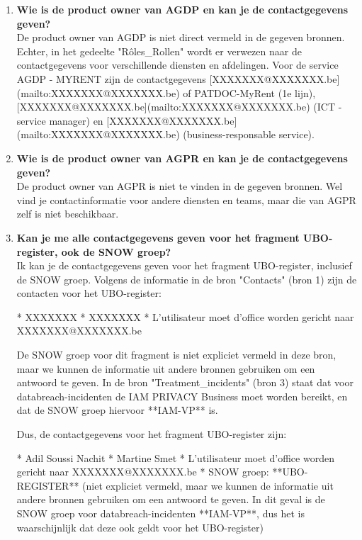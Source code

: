 \begin{enumerate}
    \item \textbf{Wie is de product owner van AGDP en kan je de contactgegevens geven?} \\
    De product owner van AGDP is niet direct vermeld in de gegeven bronnen. Echter, in het gedeelte "Rôles\_Rollen" wordt er verwezen naar de contactgegevens voor verschillende diensten en afdelingen. Voor de service AGDP - MYRENT zijn de contactgegevens [XXXXXXX@XXXXXXX.be](mailto:XXXXXXX@XXXXXXX.be) of PATDOC-MyRent (1e lijn), [XXXXXXX@XXXXXXX.be](mailto:XXXXXXX@XXXXXXX.be) (ICT - service manager) en [XXXXXXX@XXXXXXX.be](mailto:XXXXXXX@XXXXXXX.be) (business-responsable service).
    
    \item \textbf{Wie is de product owner van AGPR en kan je de contactgegevens geven?} \\
    De product owner van AGPR is niet te vinden in de gegeven bronnen. Wel vind je contactinformatie voor andere diensten en teams, maar die van AGPR zelf is niet beschikbaar.
 
    \item \textbf{Kan je me alle contactgegevens geven voor het fragment UBO-register, ook de SNOW groep?} \\
    Ik kan je de contactgegevens geven voor het fragment UBO-register, inclusief de SNOW groep. Volgens de informatie in de bron "Contacts" (bron 1) zijn de contacten voor het UBO-register:
    
    * XXXXXXX
    * XXXXXXX
    * L'utilisateur moet d'office worden gericht naar XXXXXXX@XXXXXXX.be
    
    De SNOW groep voor dit fragment is niet expliciet vermeld in deze bron, maar we kunnen de informatie uit andere bronnen gebruiken om een antwoord te geven. In de bron "Treatment\_incidents" (bron 3) staat dat voor databreach-incidenten de IAM PRIVACY Business moet worden bereikt, en dat de SNOW groep hiervoor **IAM-VP** is.
    
    Dus, de contactgegevens voor het fragment UBO-register zijn:
    
    * Adil Soussi Nachit
    * Martine Smet
    * L'utilisateur moet d'office worden gericht naar XXXXXXX@XXXXXXX.be
    * SNOW groep: **UBO-REGISTER** (niet expliciet vermeld, maar we kunnen de informatie uit andere bronnen gebruiken om een antwoord te geven. In dit geval is de SNOW groep voor databreach-incidenten **IAM-VP**, dus het is waarschijnlijk dat deze ook geldt voor het UBO-register)
    

\end{enumerate}
